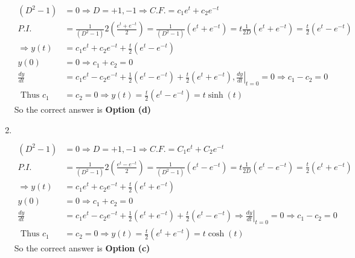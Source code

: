 \begin{enumerate}
\begin{answer}
\begin{align*}
	\left(D^{2}-1\right)&=0 \Rightarrow D=+1,-1 \Rightarrow C . F .=c_{1} e^{t}+c_{2} e^{-t}\\
	P.I. &=\frac{1}{\left(D^{2}-1\right)} 2\left(\frac{e^{t}+e^{-t}}{2}\right)=\frac{1}{\left(D^{2}-1\right)}\left(e^{t}+e^{-t}\right)=t \frac{1}{2 D}\left(e^{t}+e^{-t}\right)=\frac{t}{2}\left(e^{t}-e^{-t}\right)\\
	\Rightarrow y(t)&=c_{1} e^{t}+c_{2} e^{-t}+\frac{t}{2}\left(e^{t}-e^{-t}\right)\\
	y(0)&=0 \Rightarrow c_{1}+c_{2}=0 \\
	\frac{d y}{d t}&=c_{1} e^{t}-c_{2} e^{-t}+\frac{1}{2}\left(e^{t}-e^{-t}\right)+\frac{t}{2}\left(e^{t}+e^{-t}\right),\left.\frac{d y}{d t}\right|_{t=0}=0 \Rightarrow c_{1}-c_{2}=0\\
\text{	Thus }c_{1}&=c_{2}=0 \Rightarrow y(t)=\frac{t}{2}\left(e^{t}-e^{-t}\right)=t \sinh (t)
	\end{align*}
	So the correct answer is \textbf{Option (d)}
\end{answer}
\item $\left. \right. $
\begin{answer}
	\begin{align*}
	\left(D^{2}-1\right)&=0 \Rightarrow D=+1,-1 \Rightarrow C . F .=C_{1} e^{t}+C_{2} e^{-t}\\
	P.I. &=\frac{1}{\left(D^{2}-1\right)} 2\left(\frac{e^{t}-e^{-t}}{2}\right)=\frac{1}{\left(D^{2}-1\right)}\left(e^{t}-e^{-t}\right)=t \frac{1}{2 D}\left(e^{t}-e^{-t}\right)=\frac{t}{2}\left(e^{t}+e^{-t}\right)\\
	\Rightarrow y(t)&=c_{1} e^{t}+c_{2} e^{-t}+\frac{t}{2}\left(e^{t}+e^{-t}\right)\\
	y(0)&=0 \Rightarrow c_{1}+c_{2}=0\\
	\frac{d y}{d t}&=c_{1} e^{t}-c_{2} e^{-t}+\frac{1}{2}\left(e^{t}+e^{-t}\right)+\left.\frac{t}{2}\left(e^{t}-e^{-t}\right) \Rightarrow \frac{d y}{d t}\right|_{t=0}=0 \Rightarrow c_{1}-c_{2}=0\\
\text{	Thus }c_{1}&=c_{2}=0 \Rightarrow y(t)=\frac{t}{2}\left(e^{t}+e^{-t}\right)=t \cosh (t)
	\end{align*}
		So the correct answer is \textbf{Option (c)}
\end{answer}
\end{enumerate}
